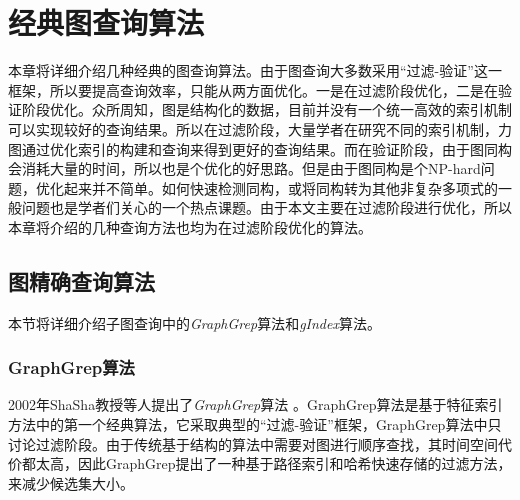 \documentclass{XDBAthesis}
\begin{document}
\def\pictures{}
\else
\fi
\chapter{经典图查询算法}
\label{chap:classic}
本章将详细介绍几种经典的图查询算法。由于图查询大多数采用“过滤-验证”这一框架，所以要提高查询效率，只能从两方面优化。一是在过滤阶段优化，二是在验证阶段优化。众所周知，图是结构化的数据，目前并没有一个统一高效的索引机制可以实现较好的查询结果。所以在过滤阶段，大量学者在研究不同的索引机制，力图通过优化索引的构建和查询来得到更好的查询结果。而在验证阶段，由于图同构会消耗大量的时间，所以也是个优化的好思路。但是由于图同构是个NP-hard问题，优化起来并不简单。如何快速检测同构，或将同构转为其他非复杂多项式的一般问题也是学者们关心的一个热点课题。由于本文主要在过滤阶段进行优化，所以本章将介绍的几种查询方法也均为在过滤阶段优化的算法。
\section{图精确查询算法}
本节将详细介绍子图查询中的\emph{GraphGrep}算法\cite{graphgrep}和\emph{gIndex}算法\cite{gIndex}。
\subsection{GraphGrep算法}
2002年ShaSha教授等人提出了\emph{GraphGrep}算法\cite{graphgrep} 。GraphGrep算法是基于特征索引方法中的第一个经典算法，它采取典型的“过滤-验证”框架，GraphGrep算法中只讨论过滤阶段。由于传统基于结构的算法中需要对图进行顺序查找，其时间空间代价都太高，因此GraphGrep提出了一种基于路径索引和哈希快速存储的过滤方法，来减少候选集大小。
\end{document}
